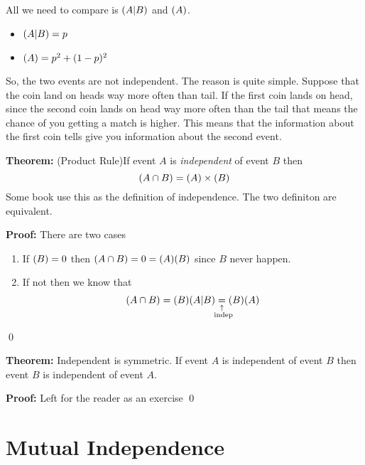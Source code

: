 \documentclass[a4paper, 12pt]{article}
\newcommand{\theorem}{\vspace{1em}\noindent\textbf{Theorem:} }
\renewcommand{\proof}{\vspace{0.5em}\noindent\textbf{Proof:} }
\newcommand{\qedd}{\qed\newline}
\newcommand{\expl}[2]{%
	\underset{\substack{\uparrow\\\mathrlap{\text{\hspace{-1em}#2}}}}{#1}}
\let\Pr\relax
\DeclareMathOperator{\Pr}{Pr}
\begin{document}
\begin{multicols}{2}
All we need to compare is $\Pr(A|B)$ and $\Pr(A)$.
\begin{itemize}
	\item $\Pr(A|B) = p$
	\item $\Pr(A) = p^2 + (1-p)^2$
\end{itemize}

So, the two events are not independent. The reason is quite simple. Suppose that the coin land on heads way more often than tail. If the first coin lands on head, since the second coin lands on head way more often than the tail that means the chance of you getting a match is higher. This means that the information about the first coin tells give you information about the second event.

\theorem (Product Rule)If event $A$ is \emph{independent} of event $B$ then
\[
	\Pr(A \cap B) = \Pr(A) \times \Pr(B)
\]
Some book use this as the definition of independence. The two definiton are equivalent.

\proof There are two cases
\begin{enumerate}[1)]
	\item If $\Pr(B) = 0$ then $\Pr (A \cap B) = 0 = \Pr(A)\Pr(B)$ since $B$ never happen.
	\item If not then we know that
	\[
		\Pr(A\cap B) = \Pr(B)\Pr(A|B) \expl{=}{indep} \Pr(B) \Pr(A)
	\]
\end{enumerate}
\qedd

\theorem Independent is symmetric. If event $A$ is independent of event $B$ then event $B$ is independent of event $A$.

\proof Left for the reader as an exercise
\qedd

\section*{Mutual Independence}



\end{multicols}
\end{document}
